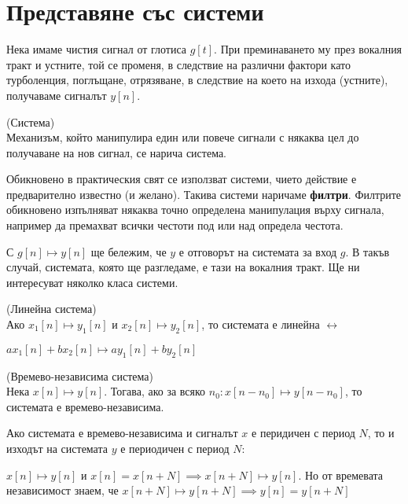 \documentclass[main.tex]{subfiles}
\begin{document}
\section{Представяне със системи}
Нека имаме чистия сигнал от глотиса $g[t]$. При преминаването му през вокалния тракт и устните, той
се променя, в следствие на различни фактори като турболенция, поглъщане, отрязяване, в следствие на което 
на изхода (устните), получаваме сигналът $y[n]$.

\begin{definition*}{(Система)}\\
Механизъм, който манипулира един или повече сигнали с някаква цел до
получаване на нов сигнал, се нарича система.

Обикновено в практическия свят се използват системи, чието действие е предварително известно (и желано). Такива системи
наричаме \textbf{филтри}. Филтрите обикновено изпълняват някаква точно определена манипулация върху сигнала, например
да премахват всички честоти под или над определа честота.
\end{definition*}

С $g[n] \mapsto y[n]$ ще бележим, че $y$ е отговорът на системата за вход $g$. В такъв случай, системата, която ще разгледаме, е тази на вокалния тракт. Ще ни интересуват
няколко класа системи.

\begin{definition*}{(Линейна система)}\\
    Ако $x_1[n] \mapsto y_1[n]$ и $x_2[n] \mapsto y_2[n]$, то системата е линейна $\longleftrightarrow$

    $ax_1[n] + bx_2[n] \mapsto ay_1[n] + by_2[n]$ 
\end{definition*}


\begin{definition*}{(Времево-независима система)}\\
    Нека $x[n] \mapsto y[n]$. Тогава, ако за всяко $n_0: x[n - n_0] \mapsto y[n - n_0]$, то
    системата е времево-независима.
\end{definition*}

\begin{property}
\label{systems:periodicity}
Ако системата е времево-независима и сигналът $x$ е перидичен с период $N$,
то и изходът на системата $y$ е периодичен с период $N$:

$x[n] \mapsto y[n]$ и $x[n] = x[n+N] \implies x[n+N] \mapsto y[n]$. Но от времевата независимост знаем, че
$x[n+N] \mapsto y[n+N] \implies y[n] = y[n+N]$
\end{property}
\end{document}
